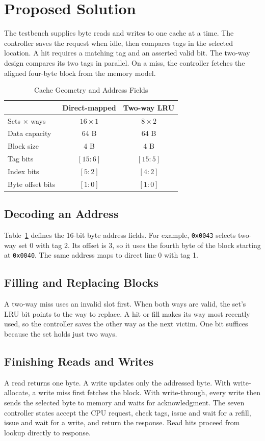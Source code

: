 \section{Proposed Solution}
The testbench supplies byte reads and writes to one cache at a time. The
controller saves the request when idle, then compares tags in the selected
location. A hit requires a matching tag and an asserted valid bit. The two-way
design compares its two tags in parallel. On a miss, the controller fetches
the aligned four-byte block from the memory model.

\begin{table}[!t]
\caption{Cache Geometry and Address Fields}
\label{tab:geom1}
\centering
\begin{tabular}{lcc}
\toprule
 & Direct-mapped & Two-way LRU\\
\midrule
Sets $\times$ ways & $16\times1$ & $8\times2$\\
Data capacity & 64 B & 64 B\\
Block size & 4 B & 4 B\\
Tag bits & $[15:6]$ & $[15:5]$\\
Index bits & $[5:2]$ & $[4:2]$\\
Byte offset bits & $[1:0]$ & $[1:0]$\\
\bottomrule
\end{tabular}
\end{table}

\subsection{Decoding an Address}
Table~\ref{tab:geom1} defines the 16-bit byte address fields. For example,
\texttt{0x0043} selects two-way set 0 with tag 2. Its offset is 3, so it
uses the fourth byte of the block starting at \texttt{0x0040}. The same
address maps to direct line 0 with tag 1.

\subsection{Filling and Replacing Blocks}
A two-way miss uses an invalid slot first. When both ways are valid, the
set's LRU bit points to the way to replace. A hit or fill makes its way
most recently used, so the controller saves the other way as the next
victim. One bit suffices because the set holds just two ways.

\subsection{Finishing Reads and Writes}
A read returns one byte. A write updates only the addressed byte. With
write-allocate, a write miss first fetches the block. With write-through,
every write then sends the selected byte to memory and waits for
acknowledgment. The seven controller states accept the CPU request, check
tags, issue and wait for a refill, issue and wait for a write, and return
the response. Read hits proceed from lookup directly to response.

